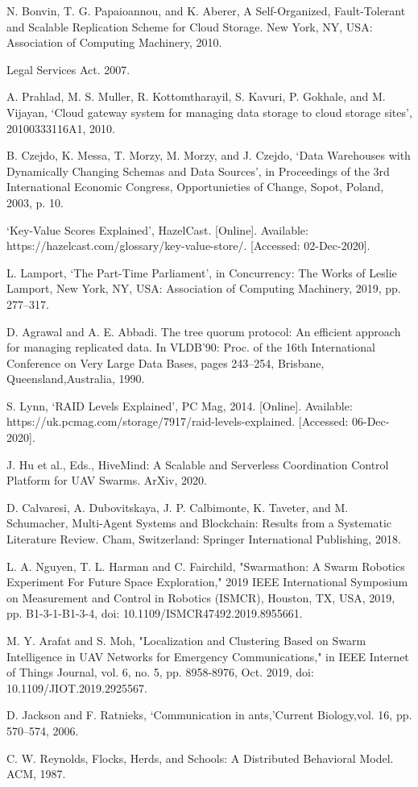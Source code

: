 \documentclass{UoYCSproject}
\begin{document}
\begin{thebibliography}{100}
N. Bonvin, T. G. Papaioannou, and K. Aberer, A Self-Organized, Fault-Tolerant and Scalable Replication Scheme for Cloud Storage. New York, NY, USA: Association of Computing Machinery, 2010.

Legal Services Act. 2007.

A. Prahlad, M. S. Muller, R. Kottomtharayil, S. Kavuri, P. Gokhale, and M. Vijayan, ‘Cloud gateway system for managing data storage to cloud storage sites’, 20100333116A1, 2010.

B. Czejdo, K. Messa, T. Morzy, M. Morzy, and J. Czejdo, ‘Data Warehouses with Dynamically Changing Schemas and Data Sources’, in Proceedings of the 3rd International Economic Congress, Opportunieties of Change, Sopot, Poland, 2003, p. 10.

‘Key-Value Scores Explained’, HazelCast. [Online]. Available: https://hazelcast.com/glossary/key-value-store/. [Accessed: 02-Dec-2020].

L. Lamport, ‘The Part-Time Parliament’, in Concurrency: The Works of Leslie Lamport, New York, NY, USA: Association of Computing Machinery, 2019, pp. 277–317.

D. Agrawal and A. E. Abbadi. The tree quorum protocol: An efficient approach for managing replicated data. In VLDB’90: Proc. of the 16th International Conference on Very Large Data Bases, pages 243–254, Brisbane, Queensland,Australia, 1990.

S. Lynn, ‘RAID Levels Explained’, PC Mag, 2014. [Online]. Available: https://uk.pcmag.com/storage/7917/raid-levels-explained. [Accessed: 06-Dec-2020].

J. Hu et al., Eds., HiveMind: A Scalable and Serverless Coordination Control Platform for UAV Swarms. ArXiv, 2020.

D. Calvaresi, A. Dubovitskaya, J. P. Calbimonte, K. Taveter, and M. Schumacher, Multi-Agent Systems and Blockchain: Results from a Systematic Literature Review. Cham, Switzerland: Springer International Publishing, 2018.

L. A. Nguyen, T. L. Harman and C. Fairchild, "Swarmathon: A Swarm Robotics Experiment For Future Space Exploration," 2019 IEEE International Symposium on Measurement and Control in Robotics (ISMCR), Houston, TX, USA, 2019, pp. B1-3-1-B1-3-4, doi: 10.1109/ISMCR47492.2019.8955661.

M. Y. Arafat and S. Moh, "Localization and Clustering Based on Swarm Intelligence in UAV Networks for Emergency Communications," in IEEE Internet of Things Journal, vol. 6, no. 5, pp. 8958-8976, Oct. 2019, doi: 10.1109/JIOT.2019.2925567.

D. Jackson and F. Ratnieks, ‘Communication in ants,’Current Biology,vol. 16, pp. 570–574, 2006.

C. W. Reynolds, Flocks, Herds, and Schools: A Distributed Behavioral Model. ACM, 1987.

\end{thebibliography}
\end{document}
